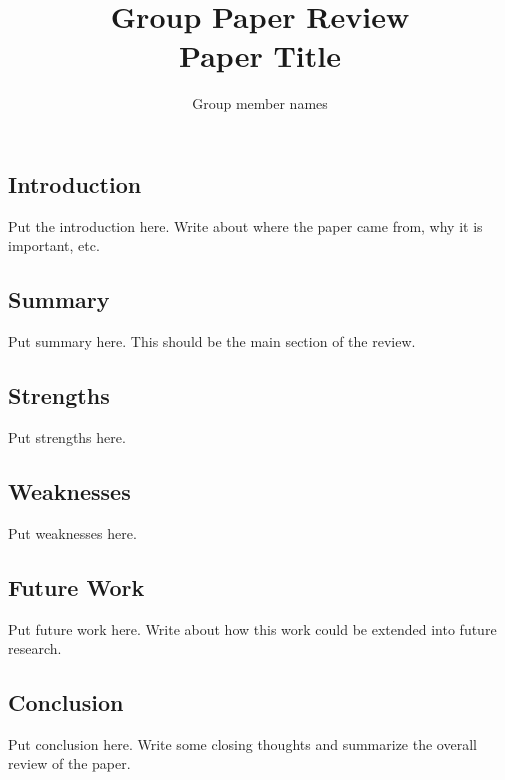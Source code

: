 \documentclass[letterpaper,twocolumn,10pt]{article}
\title{Group Paper Review\\
Paper Title}
\author{Group member names}
\begin{document}
\maketitle

\subsection*{Introduction}

Put the introduction here. Write about where the paper came from, why it is important, etc.

\subsection*{Summary}

Put summary here. This should be the main section of the review.

\subsection*{Strengths}

Put strengths here.

\subsection*{Weaknesses}

Put weaknesses here.

\subsection*{Future Work}

Put future work here. Write about how this work could be extended into future research.

\subsection*{Conclusion}

Put conclusion here. Write some closing thoughts and summarize the overall review of the paper.
\end{document}

